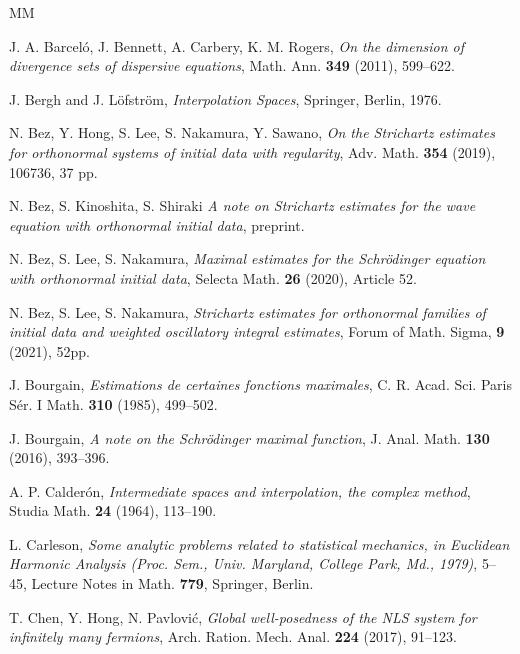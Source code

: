 \documentclass[a4paper]{amsart}
\numberwithin{equation}{section}%
\theoremstyle{plain}%
\theoremstyle{definition}
\theoremstyle{remark}%
\begin{document}
\begin{thebibliography}{MM}

 J. A. Barcel\'{o}, J. Bennett, A. Carbery, K. M. Rogers, 
\textit{On the dimension of divergence sets of dispersive equations}, 
Math. Ann. \textbf{349} (2011), 599--622. 

 J. Bergh and J. L\"{o}fstr\"{o}m, \textit{Interpolation Spaces}, Springer, Berlin, 1976.

 N. Bez, Y. Hong, S. Lee, S. Nakamura, Y. Sawano, \textit{On the Strichartz estimates for orthonormal systems of initial data with regularity},  Adv. Math. \textbf{354} (2019), 106736, 37 pp. 

 N. Bez, S. Kinoshita, S. Shiraki 
\textit{A note on Strichartz estimates for the wave equation
with orthonormal initial data},
preprint.

 N. Bez, S. Lee, S. Nakamura, \textit{Maximal estimates for the Schr\"odinger equation with orthonormal initial data}, Selecta Math. \textbf{26} (2020), Article 52.

 N. Bez, S. Lee, S. Nakamura, \textit{Strichartz estimates for orthonormal families of initial data and weighted oscillatory integral estimates}, Forum of Math. Sigma, \textbf{9} (2021), 52pp.

J. Bourgain,  
\textit{Estimations de certaines fonctions maximales}, 
C. R. Acad. Sci. Paris S\'{e}r. I Math.
\textbf{310} (1985), 499--502.


 J. Bourgain, \textit{A note on the Schr\"{o}dinger maximal function}, J. Anal. Math. \textbf{130} (2016), 393--396.

 A. P. Calder\'{o}n, \textit{Intermediate spaces and interpolation, the complex method}, Studia Math. \textbf{24} (1964), 113--190.

 L. Carleson, \textit{Some analytic problems related to statistical mechanics, in Euclidean Harmonic Analysis (Proc. Sem., Univ. Maryland, College Park, Md., 1979)}, 5--45, Lecture Notes in Math. \textbf{779}, Springer, Berlin.







 T. Chen, Y. Hong, N. Pavlovi\'{c}, \textit{Global well-posedness of the NLS system for infinitely many fermions}, Arch. Ration. Mech. Anal. \textbf{224} (2017), 91--123.


\end{thebibliography}
\end{document}
